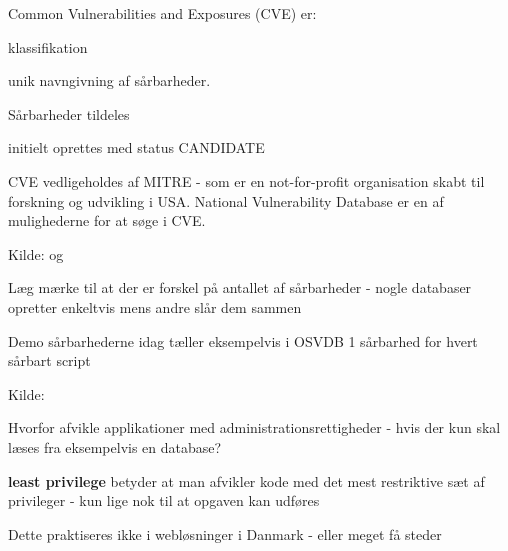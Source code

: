 \documentclass[20pt,landscape,a4paper,footrule]{foils}
\begin{document}
\begin{list1}
\item Common Vulnerabilities and Exposures (CVE) er:
  \begin{list2}
  \item klassifikation
  \item unik navngivning af sårbarheder. 
  \end{list2}
\item Sårbarheder tildeles
  \begin{list2}
  \item initielt oprettes med status CANDIDATE
  \end{list2}
\item CVE vedligeholdes af MITRE - som er en not-for-profit 
organisation skabt til forskning og udvikling i USA.
National Vulnerability Database er en af mulighederne for at søge i CVE. 
\item Kilde:  og 
\end{list1}



\begin{list1}
\item Læg mærke til at der er forskel på antallet af sårbarheder -
  nogle databaser opretter enkeltvis mens andre slår dem sammen
\item Demo sårbarhederne idag tæller eksempelvis i OSVDB 1 sårbarhed
  for hvert sårbart script  
\item Kilde: 
\end{list1}






\begin{list1}
\item Hvorfor afvikle applikationer med administrationsrettigheder -
  hvis der kun skal læses fra eksempelvis en database?
\item {\bfseries least privilege} 
betyder at man afvikler kode med det mest
restriktive sæt af privileger - kun lige nok til at
opgaven kan udføres
\item Dette praktiseres ikke i webløsninger i Danmark - eller meget få steder
\end{list1}
\end{document}
